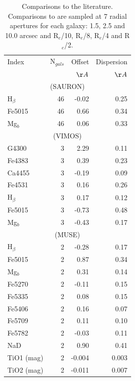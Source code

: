 	\begin{table}
		\centering
		\caption{Comparisons to the literature. Comparisons to \citet{Rampazzo2005} are sampled at 7 radial apertures for each galaxy: 1.5, 2.5 and 10.0 arcsec and R$_e$/10, R$_e$/8, R$_e$/4 and R$_e$/2.}
		\label{tab:litAbsorption}
		\begin{tabular}{l r r r}
			\hline
			\hline
			Index 		& N$_{gals}$ & Offset 	& Dispersion \\
						& 			& $\AA$		& $\AA$ \\
			\hline
			\multicolumn{4}{c}{\citet{Vazdekis2010} (SAURON)} \\
			\hline
			H$_\beta$ 	& 46		& -0.02		& 0.25	\\
			Fe5015		& 46		& 0.66		& 0.34	\\
			Mg$_b$ 		& 46		& 0.06		& 0.33	\\
			\hline
			\multicolumn{4}{c}{\citet{Rampazzo2005} (VIMOS)} \\
			\hline
			G4300 		& 3 		& 2.29		& 0.11	\\
			Fe4383 		& 3 		& 0.39		& 0.23	\\
			Ca4455 		& 3 		& -0.19		& 0.09	\\
			Fe4531 		& 3 		& 0.16		& 0.26	\\
			H$_\beta$ 	& 3 		& 0.17		& 0.12	\\
			Fe5015 		& 3 		& -0.73		& 0.48	\\
			Mg$_b$ 		& 3 		& -0.43		& 0.17	\\
			\hline
			\multicolumn{4}{c}{\citet{Rampazzo2005} (MUSE)} \\
			\hline
			H$_\beta$ 	& 2 		& -0.28		& 0.17	\\ 
			Fe5015 		& 2 		& 0.87		& 0.34	\\ 
			Mg$_b$ 		& 2 		& 0.31		& 0.14	\\
			Fe5270 		& 2 		& -0.11		& 0.15	\\
			Fe5335 		& 2 		& 0.08		& 0.15	\\
			Fe5406 		& 2 		& 0.16		& 0.07	\\
			Fe5709 		& 2 		& 0.11		& 0.10	\\
			Fe5782 		& 2 		& -0.03		& 0.11	\\
			NaD 		& 2 		& 0.90		& 0.41	\\
			TiO1 (mag)	& 2 		& -0.004	& 0.003	\\
			TiO2 (mag)	& 2 		& -0.011	& 0.007	\\
			\hline
		\end{tabular}
	\end{table}


